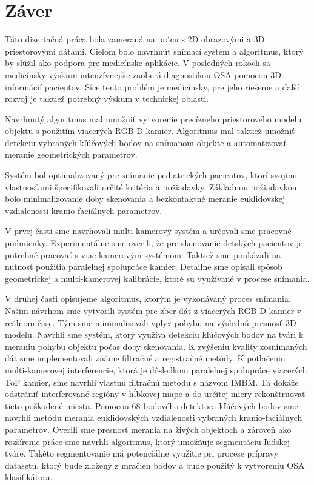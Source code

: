 \chapter{Záver}

\pagestyle{fancy}
\fancyhf{}
\fancyfoot[CE,CO]{\thepage}


Táto dizertačná práca bola zameraná na prácu s 2D obrazovými a 3D priestorovými dátami. Cieľom bolo navrhnúť snímací systém a algoritmus, ktorý by slúžil ako podpora pre medicínske aplikácie. V posledných rokoch sa medicínsky výskum intenzívnejšie zaoberá diagnostikou OSA pomocou 3D informácií pacientov. Síce tento problém je medicínsky, pre jeho riešenie a ďalší rozvoj je taktiež potrebný výskum v technickej oblasti. \newline

Navrhnutý algoritmus mal umožniť vytvorenie precízneho priestorového modelu objektu s použitím viacerých RGB-D kamier. Algoritmus mal taktiež umožniť detekciu vybraných kľúčových bodov na snímanom objekte a automatizovať meranie geometrických parametrov.  \newline

Systém bol optimalizovaný pre snímanie pediatrických pacientov, ktorí svojimi vlastnosťami špecifikovali určité kritéria a požiadavky. Základnou požiadavkou bolo minimalizovanie doby skenovania a bezkontaktné meranie euklidovskej vzdialenosti kranio-faciálnych parametrov.  \newline

V prvej časti sme navrhovali multi-kamerový systém a určovali sme pracovné podmienky. Experimentálne sme overili, že pre skenovanie detských pacientov je potrebné pracovať s viac-kamerovým systémom. Taktiež sme poukázali na nutnosť použitia paralelnej spolupráce kamier. Detailne sme opísali spôsob geometrickej a multi-kamerovej kalibrácie, ktoré su využívané v procese snímania.  \newpage

V druhej časti opisujeme algoritmus, ktorým je vykonávaný proces snímania. Našim návrhom sme vytvorili systém pre zber dát z viacerých RGB-D kamier v reálnom čase. Tým sme minimalizovali vplyv pohybu na výslednú presnosť 3D modelu. Navrhli sme systém, ktorý využíva detekciu kľúčových bodov na tvári k meraniu pohybu objektu počas doby skenovania. K zvýšeniu kvality zosnímaných dát sme implementovali známe filtračné a registračné metódy. K potlačeniu multi-kamerovej interferencie, ktorá je dôsledkom paralelnej spolupráce viacerých ToF kamier, sme navrhli vlastnú filtračnú metódu s názvom IMBM. Tá dokáže odstrániť interferované regióny v hĺbkovej mape a do určitej miery rekonštruovať tieto poškodené miesta. Pomocou 68 bodového detektora kľúčových bodov sme navrhli metódu merania euklidovských vzdialenosti vybraných kranio-faciálnych parametrov. Overili sme presnosť merania na živých objektoch a zároveň ako rozšírenie práce sme navrhli algoritmus, ktorý umožňuje segmentáciu ľudskej tváre. Takéto segmentovanie má potenciálne využitie pri procese prípravy datasetu, ktorý bude zložený z mračien bodov a bude použitý k vytvoreniu OSA klasifikátora. \newline 

